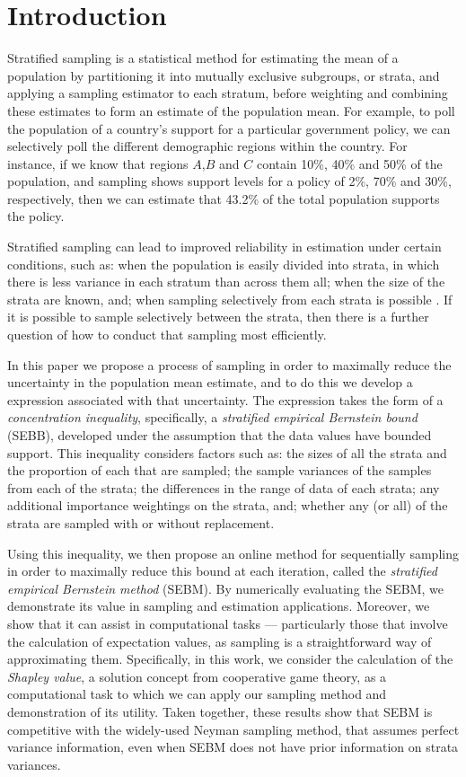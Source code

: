 \documentclass[]{interact}
\theoremstyle{plain}%
\theoremstyle{definition}
\theoremstyle{remark}
\begin{document}
\section{Introduction}

Stratified sampling is a statistical method for estimating the mean of a population by partitioning it into mutually exclusive subgroups, or strata, and applying a sampling estimator to each stratum, before weighting and combining these estimates to form an estimate of the population mean.
For example, to poll the population of a country's support for a particular government policy, we can selectively poll the different demographic regions within the country.
For instance, if we know that regions $A$,$B$ and $C$ contain 10\%, 40\% and 50\% of the population, and sampling shows support levels for a policy of 2\%, 70\% and 30\%, respectively, then we can estimate that 43.2\% of the total population supports the policy.

Stratified sampling can lead to improved reliability in estimation under certain conditions, such as: 
when the population is easily divided into strata, in which there is less variance in each stratum than across them all; 
when the size of the strata are known, and; 
when sampling selectively from each strata is possible \cite{1938.10503378,10.2307/23339498}.
If it is possible to sample selectively between the strata, then there is a further question of how to conduct that sampling most efficiently.

In this paper we propose a process of sampling in order to maximally reduce the uncertainty in the population mean estimate, 
and to do this we develop a expression associated with that uncertainty.
The expression takes the form of a \textit{concentration inequality}, specifically, a \textit{stratified empirical Bernstein bound} (SEBB),
developed under the assumption that the data values have bounded support. 
This inequality considers factors such as: 
the sizes of all the strata and the proportion of each that are sampled; 
the sample variances of the samples from each of the strata;
the differences in the range of data of each strata;
any additional importance weightings on the strata, and; 
whether any (or all) of the strata are sampled with or without replacement.

Using this inequality, we then propose an online method for sequentially sampling in order to maximally reduce this bound at each iteration, called the \textit{stratified empirical Bernstein method} (SEBM).
By numerically evaluating the SEBM, we demonstrate its value in sampling and estimation applications.
Moreover, we show that it can assist in computational tasks --- particularly those that involve the calculation of expectation values, as sampling is a straightforward way of approximating them.
Specifically, in this work, we consider the calculation of the \textit{Shapley value}, a solution concept from cooperative game theory, as a computational task to which we can apply our sampling method and demonstration of its utility.
Taken together, these results show that SEBM is competitive with the widely-used Neyman sampling method, that assumes perfect variance information, even when SEBM does not have prior information on strata variances.
\end{document}

